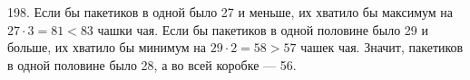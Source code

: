 198. Если бы пакетиков в одной было 27 и меньше, их хватило бы максимум на $27\cdot3=81<83$ чашки чая. Если бы пакетиков в одной половине было 29 и больше, их хватило бы минимум на $29\cdot2=58>57$ чашек чая. Значит, пакетиков в одной половине было 28, а во всей коробке --- 56.\\
